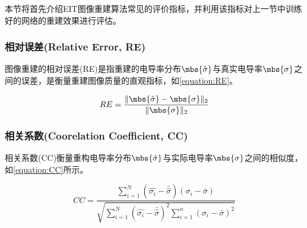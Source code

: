 
本节将首先介绍EIT图像重建算法常见的评价指标，并利用该指标对上一节中训练好的网络的重建效果进行评估。

\subsubsection{相对误差(Relative Error, RE)}

图像重建的相对误差(RE)是指重建的电导率分布$\mbs{\hat{\sigma}}$与真实电导率$\mbs{\sigma}$之间的误差，是衡量重建图像质量的直观指标，如\cref{equation:RE}。

\begin{equation}
    \label{equation:RE}
    RE = \frac{\| \mbs{\hat{\sigma}} - \mbs{\sigma}\|_2}{\|\mbs{\sigma}\|_2}
\end{equation}

\subsubsection{相关系数(Coorelation Coefficient, CC)}

相关系数(CC)衡量重构电导率分布$\mbs{\hat{\sigma}}$与实际电导率$\mbs{\sigma}$之间的相似度，如\cref{equation:CC}所示。

\begin{equation}
    \label{equation:CC}
    CC = \frac{\sum_{i=1}^{N} \left(\hat{\sigma_i} - \bar{\hat{\sigma}}\right)\left(\sigma_i-\bar{\sigma}\right)}{\sqrt{\sum_{i=1}^{N} \left(\hat{\sigma_i} - \bar{\hat{\sigma}}\right)^2 \sum_{i=1}^{n} \left(\sigma_i-\bar{\sigma}\right)^2}}
\end{equation}


